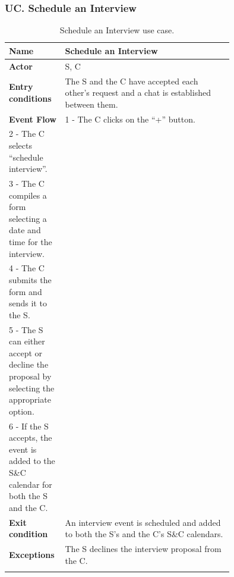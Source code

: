 \subsubsection*{UC\cuc . Schedule an Interview}
\begin{center}
    \begin{longtable}{|l|p{0.75\linewidth}|}
        \hline
        \textbf{Name}               & Schedule an Interview\\
        \hline
        \textbf{Actor}              & S, C\\
        \hline
        \textbf{Entry conditions}   & The S and the C have accepted each other’s request and a chat is established between them.\\
        \hline
        \textbf{Event Flow}         & 
        1 - The C clicks on the “+” button. \\
        2 - The C selects “schedule interview”. \\
        3 - The C compiles a form selecting a date and time for the interview. \\
        4 - The C submits the form and sends it to the S. \\
        5 - The S can either accept or decline the proposal by selecting the appropriate option. \\
        6 - If the S accepts, the event is added to the S\&C calendar for both the S and the C. \\
        \hline
        \textbf{Exit condition}   & An interview event is scheduled and added to both the S’s and the C’s S\&C calendars. \\       
        \hline
        \textbf{Exceptions}       & The S declines the interview proposal from the C. \\
        \hline
        \caption{Schedule an Interview use case.}
        \label{tab: schedule_interview_use_case}
    \end{longtable}
\end{center}


